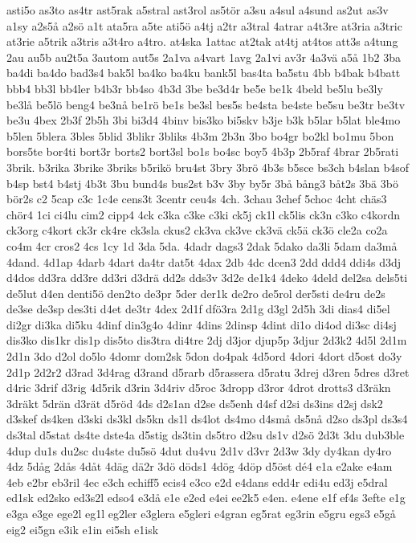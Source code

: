 {asti5o
as3to
as4tr
ast5rak
a5stral
ast3rol
as5tör
a3su
a4sul
a4sund
as2ut
as3v
a1sy
a2s5å
a2sö
a1t
ata5ra
a5te
ati5ö
a4tj
a2tr
a3tral
4atrar
a4t3re
at3ria
a3tric
at3rie
a5trik
a3tris
a3t4ro
a4tro.
at4ska
1attac
at2tak
at4tj
at4tos
att3s
a4tung
2au
au5b
au2t5a
3autom
aut5s
2a1va
a4vart
1avg
2a1vi
av3r
4a3vä
a5å
1b2
3ba
ba4di
ba4do
bad3s4
bak5l
ba4ko
ba4ku
bank5l
bas4ta
ba5stu
4bb
b4bak
b4batt
bbb4
bb3l
bb4ler
b4b3r
bb4so
4b3d
3be
be3d4r
be5e
be1k
4beld
be5lu
be3ly
be3lå
be5lö
beng4
be3nå
be1rö
be1s
be3sl
bes5s
be4sta
be4ste
be5su
be3tr
be3tv
be3u
4bex
2b3f
2b5h
3bi
bi3d4
4binv
bis3ko
bi5skv
b3je
b3k
b5lar
b5lat
ble4mo
b5len
5blera
3bles
5blid
3blikr
3bliks
4b3m
2b3n
3bo
bo4gr
bo2kl
bo1mu
5bon
bors5te
bor4ti
bort3r
borts2
bort3sl
bo1s
bo4sc
boy5
4b3p
2b5raf
4brar
2b5rati
3brik.
b3rika
3brike
3briks
b5rikö
bru4st
3bry
3brö
4b3s
b5sce
bs3ch
b4slan
b4sof
b4sp
bst4
b4stj
4b3t
3bu
bund4s
bus2st
b3v
3by
by5r
3bå
bång3
båt2s
3bä
3bö
bör2s
c2
5cap
c3c
1c4e
cens3t
3centr
ceu4s
4ch.
3chau
3chef
5choc
4cht
chäs3
chör4
1ci
ci4lu
cim2
cipp4
4ck
c3ka
c3ke
c3ki
ck5j
ck1l
ck5lis
ck3n
c3ko
c4kordn
ck3org
c4kort
ck3r
ck4re
ck3sla
ckus2
ck3va
ck3ve
ck3vä
ck5ä
ck3ö
cle2a
co2a
co4m
4cr
cros2
4cs
1cy
1d
3da
5da.
4dadr
dags3
2dak
5dako
da3li
5dam
da3må
4dand.
4d1ap
4darb
4dart
da4tr
dat5t
4dax
2db
4dc
dcen3
2dd
ddd4
ddi4s
d3dj
d4dos
dd3ra
dd3re
dd3ri
d3drä
dd2s
dds3v
3d2e
de1k4
4deko
4deld
del2sa
dels5ti
de5lut
d4en
denti5ö
den2to
de3pr
5der
der1k
de2ro
de5rol
der5sti
de4ru
de2s
de3se
de3sp
des3ti
d4et
de3tr
4dex
2d1f
dfö3ra
2d1g
d3gl
2d5h
3di
dias4
di5el
di2gr
di3ka
di5ku
4dinf
din3g4o
4dinr
4dins
2dinsp
4dint
di1o
di4od
di3sc
di4sj
dis3ko
dis1kr
dis1p
dis5to
dis3tra
di4tre
2dj
d3jor
djup5p
3djur
2d3k2
4d5l
2d1m
2d1n
3do
d2ol
do5lo
4domr
dom2sk
5don
do4pak
4d5ord
4dori
4dort
d5ost
do3y
2d1p
2d2r2
d3rad
3d4rag
d3rand
d5rarb
d5rassera
d5ratu
3drej
d3ren
5dres
d3ret
d4ric
3drif
d3rig
4d5rik
d3rin
3d4riv
d5roc
3dropp
d3ror
4drot
drotts3
d3räkn
3dräkt
5drän
d3rät
d5röd
4ds
d2s1an
d2se
ds5enh
d4sf
d2si
ds3ins
d2sj
dsk2
d3skef
ds4ken
d3ski
ds3kl
ds5kn
ds1l
ds4lot
ds4mo
d4små
ds5nå
d2so
ds3pl
ds3s4
ds3tal
d5stat
ds4te
dste4a
d5stig
ds3tin
ds5tro
d2su
ds1v
d2sö
2d3t
3du
dub3ble
4dup
du1s
du2sc
du4ste
du5sö
4dut
du4vu
2d1v
d3vr
2d3w
3dy
dy4kan
dy4ro
4dz
5dåg
2dås
4dåt
4däg
dä2r
3dö
döds1
4dög
4döp
d5öst
dé4
e1a
e2ake
e4am
4eb
e2br
eb3ril
4ec
e3ch
echiff5
ecis4
e3co
e2d
e4dans
edd4r
edi4u
ed3j
e5dral
ed1sk
ed2sko
ed3s2l
edso4
e3då
e1e
e2ed
e4ei
ee2k5
e4en.
e4ene
e1f
ef4s
3efte
e1g
e3ga
e3ge
ege2l
eg1l
eg2ler
e3glera
e5gleri
e4gran
eg5rat
eg3rin
e5gru
egs3
e5gå
eig2
ei5gn
e3ik
e1in
ei5sh
e1isk
}
